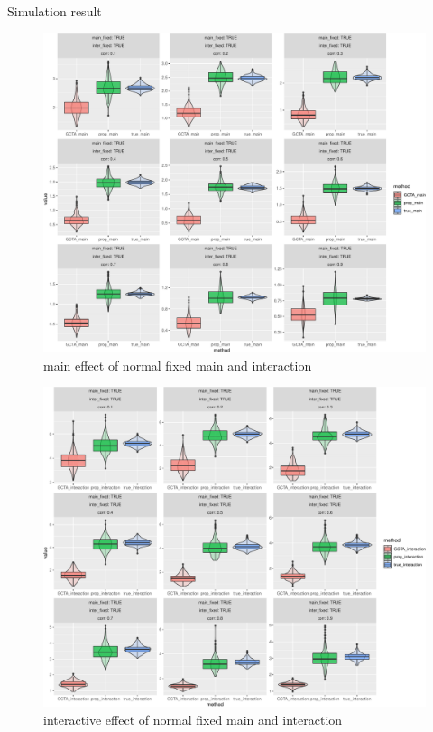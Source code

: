\documentclass[]{article}
\begin{document}
Simulation result

\begin{figure}
\centering
\includegraphics{Simulation_report_files/figure-latex/main_fixed_fixed_normal-1.pdf}
\caption{main effect of normal fixed main and interaction}
\end{figure}

\begin{figure}
\centering
\includegraphics{Simulation_report_files/figure-latex/inter_fixed_fixed_normal-1.pdf}
\caption{interactive effect of normal fixed main and interaction}
\end{figure}
\end{document}
